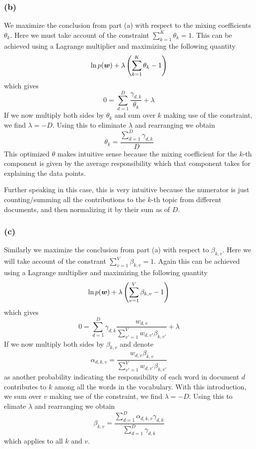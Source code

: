 \documentclass[submit]{harvardml}
\begin{document}
\subsubsection*{(b)}

We maximize the conclusion from part (a) with respect to the mixing coefficients $\theta_k$. Here we must take account of the constraint $\sum_{k=1}^K \theta_k = 1$. This can be achieved using a Lagrange multiplier and maximizing the following quantity
$$ \ln p (\boldsymbol{w}) + \lambda \left( \sum_{k=1}^K \theta_k - 1 \right) $$
which gives
$$ 0 = \sum_{d=1}^D \frac{\gamma_{d,k}}{\theta_k} + \lambda $$
If we now multiply both sides by $\theta_k$ and sum over $k$ making use of the constraint, we find $\lambda = -D$. Using this to eliminate $\lambda$ and rearranging we obtain
$$ \theta_k = \frac{\sum_{d=1}^D \gamma_{d,k}}{D} $$ 
This optimized $\theta$ makes intuitive sense because the mixing coefficient for the $k$-th component is given by the average responsibility which that component takes for explaining the data points.

Further speaking in this case, this is very intuitive because the numerator is just counting/summing all the contributions to the $k$-th topic from different documents, and then normalizing it by their sum as of $D$.

\subsubsection*{(c)}

Similarly we maximize the conclusion from part (a) with respect to $\beta_{k,v}$. Here we will take account of the constrant $\sum_{v=1}^V \beta_{k, v} = 1$. Again this can be achieved using a Lagrange multiplier and maximizing the following quantity 
$$ \ln p (\boldsymbol{w}) + \lambda \left( \sum_{v=1}^V \beta_{k,v} - 1 \right) $$
which gives
$$ 0 = \sum_{d=1}^D \gamma_{d,k} \frac{w_{d,v}}{\sum_{v'=1}^Vw_{d,v'}\beta_{k,v'}} + \lambda $$
If we now multiply both sides by $\beta_{k,v}$ and denote 
$$ \alpha_{d,k,v} = \frac{w_{d,v}\beta_{k,v}}{\sum_{v'=1}^Vw_{d,v'}\beta_{k,v'}} $$
as another probability indicating the responsibility of each word in document $d$ contributes to $k$ among all the words in the vocabulary. With this introduction, we sum over $v$ making use of the constraint, we find $\lambda = -D$. Using this to elimate $\lambda$ and rearranging we obtain 
$$\beta_{k,v} = \frac{\sum_{d=1}^D \alpha_{d,k,v} \gamma_{d,k}}{\sum_{d=1}^D \gamma_{d,k}}$$
which applies to all $k$ and $v$.
\end{document}
